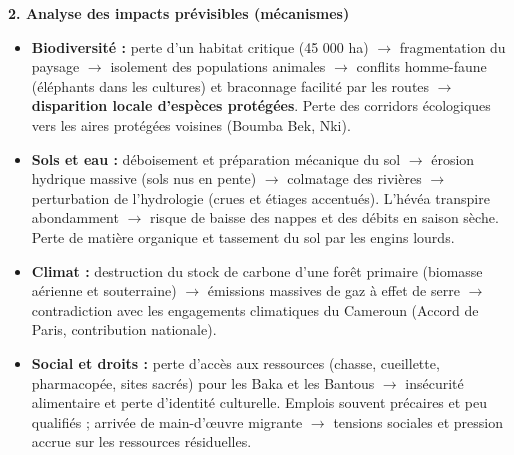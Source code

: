 \documentclass[11pt]{article}
\begin{document}
\begin{exoresolu}
\textbf{2. Analyse des impacts prévisibles (mécanismes)}\par
\begin{itemize}
    \item \textbf{Biodiversité :} perte d'un habitat critique (45 000 ha) $\rightarrow$ fragmentation du paysage $\rightarrow$ isolement des populations animales $\rightarrow$ conflits homme-faune (éléphants dans les cultures) et braconnage facilité par les routes $\rightarrow$ \textbf{disparition locale d'espèces protégées}. Perte des corridors écologiques vers les aires protégées voisines (Boumba Bek, Nki).
    \item \textbf{Sols et eau :} déboisement et préparation mécanique du sol $\rightarrow$ érosion hydrique massive (sols nus en pente) $\rightarrow$ colmatage des rivières $\rightarrow$ perturbation de l'hydrologie (crues et étiages accentués). L'hévéa transpire abondamment $\rightarrow$ risque de baisse des nappes et des débits en saison sèche. Perte de matière organique et tassement du sol par les engins lourds.
    \item \textbf{Climat :} destruction du stock de carbone d'une forêt primaire (biomasse aérienne et souterraine) $\rightarrow$ émissions massives de gaz à effet de serre $\rightarrow$ contradiction avec les engagements climatiques du Cameroun (Accord de Paris, contribution nationale).
    \item \textbf{Social et droits :} perte d'accès aux ressources (chasse, cueillette, pharmacopée, sites sacrés) pour les Baka et les Bantous $\rightarrow$ insécurité alimentaire et perte d'identité culturelle. Emplois souvent précaires et peu qualifiés ; arrivée de main-d'œuvre migrante $\rightarrow$ tensions sociales et pression accrue sur les ressources résiduelles.
\end{itemize}


\end{exoresolu}
\end{document}
